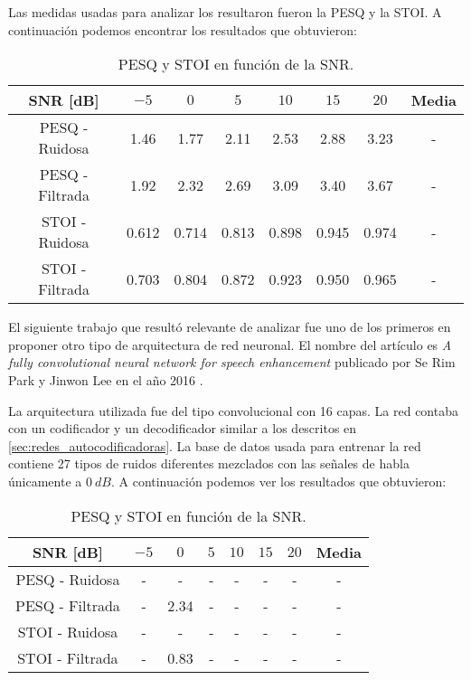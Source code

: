 Las medidas usadas para analizar los resultaron fueron la PESQ y la STOI. A continuación podemos encontrar los resultados que obtuvieron:

\begin{table}[H]
	\centering
	\begin{tabular}{ |c|c|c|c|c|c|c|c| } 
		\hline
		SNR [dB] & $-5$ & $0$ & $5$ & $10$ & $15$ & $20$ & Media \\ 
		\hline
		PESQ - Ruidosa & 1.46 & 1.77 & 2.11 & 2.53 & 2.88 & 3.23 & - \\
		PESQ - Filtrada & 1.92 & 2.32 & 2.69 & 3.09 & 3.40 & 3.67 & - \\
		STOI - Ruidosa & 0.612 & 0.714 & 0.813 & 0.898 & 0.945 & 0.974 & - \\
		STOI - Filtrada & 0.703 & 0.804 & 0.872 & 0.923 & 0.950 & 0.965 & - \\
		\hline
	\end{tabular}
	\caption{PESQ y STOI en función de la SNR.}
\end{table}


El siguiente trabajo que resultó relevante de analizar fue uno de los primeros en proponer otro tipo de arquitectura de red neuronal. El nombre del artículo es \emph{A fully convolutional neural network for speech enhancement} publicado por Se Rim Park y Jinwon Lee en el año 2016 \cite{a_fully_convolutional_neural_network_for_speech_enhancement}. 

La arquitectura utilizada fue del tipo convolucional con 16 capas. La red contaba con un codificador y un decodificador similar a los descritos en \ref{sec:redes_autocodificadoras}. La base de datos usada para entrenar la red contiene 27 tipos de ruidos diferentes mezclados con las señales de habla únicamente a $\SI{0}{dB}$. A continuación podemos ver los resultados que obtuvieron:

\begin{table}[H]
	\centering
	\begin{tabular}{ |c|c|c|c|c|c|c|c| } 
		\hline
		SNR [dB] & $-5$ & $0$ & $5$ & $10$ & $15$ & $20$ & Media \\ 
		\hline
		PESQ - Ruidosa & - & - & - & - & - & - & - \\
		PESQ - Filtrada & - & 2.34 & - & - & - & - & - \\
		STOI - Ruidosa & - & - & - & - & - & - & - \\
		STOI - Filtrada & - & 0.83 & - & - & - & - & - \\
		\hline
	\end{tabular}
	\caption{PESQ y STOI en función de la SNR.}
\end{table}



